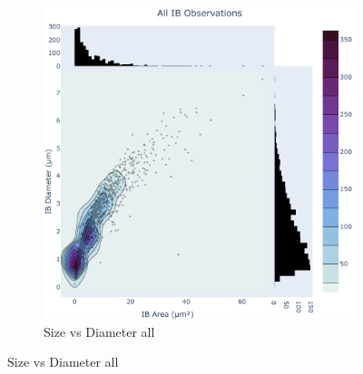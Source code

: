 \begin{figure}
    \begin{subfigure}{1\textwidth}
    \includegraphics[width=1\linewidth]{09. Chapter 4/Figs/01. Localisation introduction/02. heatmap_all.pdf} 
    \caption[]{Size vs Diameter all}


\end{subfigure}
\end{figure}
